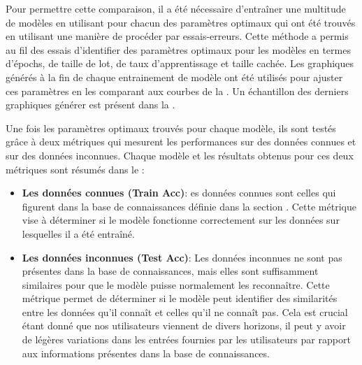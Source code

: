 \documentclass{rapport}
\begin{document}
 Pour permettre cette comparaison, il a été nécessaire d'entraîner une multitude de modèles en utilisant pour chacun des paramètres optimaux qui ont été trouvés en utilisant une manière de procéder par essais-erreurs. Cette méthode a permis au fil des essais d'identifier des paramètres optimaux pour les modèles en termes d'épochs, de taille de lot, de taux d'apprentissage et taille cachée. Les graphiques générés à la fin de chaque entrainement de modèle ont été utilisés pour ajuster ces paramètres en les comparant aux courbes de la . Un échantillon des derniers graphiques générer est présent dans la .\\



 \newpage
Une fois les paramètres optimaux trouvés pour chaque modèle, ils sont testés grâce à deux métriques qui mesurent les performances sur des données connues et sur des données inconnues. Chaque modèle et les résultats obtenus pour ces deux métriques sont résumés dans le :
\begin{itemize}
    \item \textbf{Les données connues (Train Acc)}: es données connues sont celles qui figurent dans la base de connaissances définie dans la section . Cette métrique vise à déterminer si le modèle fonctionne correctement sur les données sur lesquelles il a été entraîné.
    \item \textbf{Les données inconnues (Test Acc)}: Les données inconnues ne sont pas présentes dans la base de connaissances, mais elles sont suffisamment similaires pour que le modèle puisse normalement les reconnaître. Cette métrique permet de déterminer si le modèle peut identifier des similarités entre les données qu'il connaît et celles qu'il ne connaît pas. Cela est crucial étant donné que nos utilisateurs viennent de divers horizons, il peut y avoir de légères variations dans les entrées fournies par les utilisateurs par rapport aux informations présentes dans la base de connaissances. 
\end{itemize}
\end{document}
